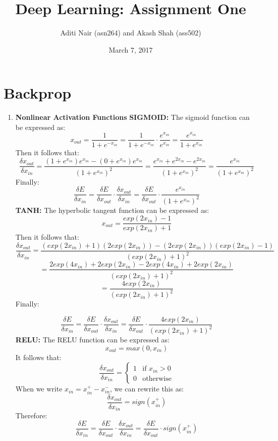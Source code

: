 \documentclass[a4paper]{article}
\title{Deep Learning: Assignment One}
\author{Aditi Nair (asn264) and Akash Shah (ass502)}
\date{March 7, 2017}
\begin{document}
\maketitle

\section{Backprop}
\begin{enumerate}
\item{ \textbf{Nonlinear Activation Functions}
\newline
\newline
\textbf{SIGMOID:}
\newline
\newline
The sigmoid function can be expressed as:
$$x_{out} = \frac{1}{1 + e^{-x_{in}}} = \frac{1}{1 + e^{-x_{in}}} \cdot \frac{e^{x_{in}}}{e^{x_{in}}} = \frac{e^{x_{in}}}{1+e^{x_{in}}} $$
Then it follows that:
$$\frac{\delta x_{out}}{\delta x_{in}} = \frac{(1+e^{x_{in}} )e^{x_{in}} - (0 + e^{x_{in}})e^{x_{in}}  } {(1+e^{{x_{in}}})^2} 
= \frac{e^{x_{in}} + e^{2x_{in}} - e^{2x_{in} }} {(1+e^{x_{in}})^2} =  \frac{e^{x_{in}} } {(1+e^{x_{in}})^2} 
$$
Finally:
$$\frac{\delta E} {\delta x_{in}} = \frac{\delta E}{\delta x_{out}} \cdot  \frac{\delta x_{out}}{\delta x_{in}}
= \frac{\delta E}{\delta x_{out}} \cdot \frac{e^{x_{in}}}{(1+e^{x_{in}})^2}$$
\newline
\textbf{TANH:}
\newline
\newline
The hyperbolic tangent function can be expressed as:
$$x_{out} = \frac{exp(2x_{in})-1}{exp(2x_{in})+1}$$
Then it follows that:
$$ \frac{\delta x_{out}}{\delta x_{in}} = \frac{ ( exp(2x_{in})+1 )(2exp(2x_{in})) - (2exp(2x_{in}))(exp(2x_{in})-1)  }{ (exp(2x_{in})+1)^2 } $$
$$ = \frac{ 2exp(4x_{in})+2exp(2x_{in})-2exp(4x_{in})+2exp(2 x_{in}) }{ (exp(2x_{in})+1)^2 } $$
$$ = \frac{ 4 exp(2 x_{in}) }{(exp(2x_{in})+1)^2 }$$
Finally:

$$\frac{\delta E}{\delta x_{in}} = \frac{\delta E}{\delta x_{out}} \cdot  \frac{\delta x_{out}}{\delta x_{in}} =  \frac{\delta E}{\delta x_{out}} \cdot \frac{4 exp(2 x_{in})}{(exp(2 x_{in})+1)^2} $$
\newline
\textbf{RELU:}\newline
\newline
The RELU function can be expressed as:
$$x_{out} = max(0,x_{in})$$
It follows that:
\begin{equation}\frac{\delta x_{out}}{\delta x_{in}} = 
\left\{
	\begin{array}{ll}
		1 & \mbox{if } x_{in}  > 0\\
		0 & \mbox{otherwise}
	\end{array}
\right.\end{equation}
When we write $x_{in} = x_{in}^+ - x_{in}^-$, we can rewrite this as:
$$\frac{\delta x_{out}}{\delta x_{in}} = sign(x_{in}^+) $$ 
Therefore:
$$\frac{\delta E}{\delta x_{in}} =  \frac{\delta E}{\delta x_{out}} \cdot \frac{\delta x_{out}}{\delta x_{in}} = \frac{\delta E}{\delta x_{out}} \cdot sign(x_{in}^+) $$

}
\end{enumerate}
\end{document}
